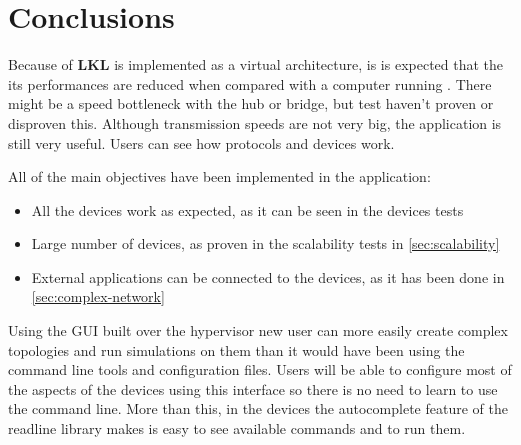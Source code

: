 \chapter{Conclusions}
\label{chapter:conclusions}

Because of \textbf{LKL} is implemented as a virtual architecture, is is expected
that the its performances are reduced when compared with a computer running .
There might be a speed bottleneck with the hub or bridge, but test haven't proven or disproven
this. Although transmission speeds are not very big, the application is still very useful. Users can
see how protocols and devices work.

All of the main objectives have been implemented in the application:
\begin{itemize}
	\item All the devices work as expected, as it can be seen in the devices tests
	\item Large number of devices, as proven in the scalability tests in \ref{sec:scalability}
	\item External applications can be connected to the \textbf{\project} devices, as it has
been done in \ref{sec:complex-network}
\end{itemize}

Using the GUI built over the hypervisor new user can more easily create complex topologies and run simulations
on them than it would have been using the command line tools and configuration files. Users will be able to configure
most of the aspects of the devices using this interface so there is no need to learn to use the command line. More than
this, in the devices the autocomplete feature of the readline library makes is easy to see available commands and
to run them.
